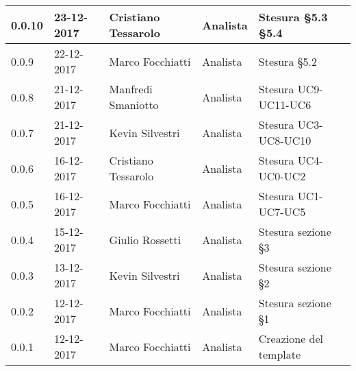 \documentclass[./AnalisideiRequisiti.tex]{subfiles}
\begin{document}
{\begin{longtable}{|p{20mm}|p{20mm}|p{40mm}|p{30mm}|p{50mm}|}
		0.0.10 & 23-12-2017 & Cristiano Tessarolo & Analista & Stesura §5.3 §5.4\\ \hline		
		0.0.9 & 22-12-2017 & Marco Focchiatti & Analista & Stesura §5.2 \\ \hline		
		0.0.8 & 21-12-2017 & Manfredi Smaniotto & Analista & Stesura UC9-UC11-UC6\\ \hline
		0.0.7 & 21-12-2017 & Kevin Silvestri & Analista & Stesura UC3-UC8-UC10\\ \hline
		0.0.6 & 16-12-2017 & Cristiano Tessarolo & Analista & Stesura UC4-UC0-UC2\\ \hline
		0.0.5 & 16-12-2017 & Marco Focchiatti & Analista & Stesura UC1-UC7-UC5\\ \hline
		0.0.4 & 15-12-2017 & Giulio Rossetti & Analista & Stesura sezione §3\\ \hline
		0.0.3 & 13-12-2017 & Kevin Silvestri & Analista & Stesura sezione §2\\ \hline
		0.0.2 & 12-12-2017 & Marco Focchiatti & Analista & Stesura sezione §1\\ \hline
		0.0.1 & 12-12-2017 & Marco Focchiatti & Analista & Creazione del template\\ \hline
	\end{longtable}

}	
\end{document}
